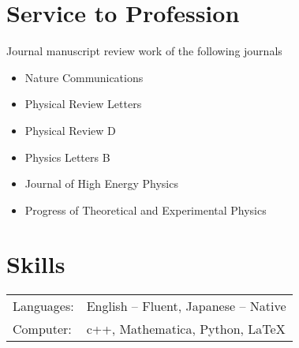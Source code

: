 \documentclass[12pt]{article}
\begin{document}
\section*{Service to Profession}
\vspace*{1em}
Journal manuscript review work of the following journals
\begin{itemize}
  \setlength\itemsep{0em}
  \item Nature Communications
  \item Physical Review Letters
  \item Physical Review D
  \item Physics Letters B
  \item Journal of High Energy Physics
  \item Progress of Theoretical and Experimental Physics
\end{itemize}

\section*{Skills}
\begin{table}[H]
  \begin{tabular}{lp{6in}}
    Languages: & English -- Fluent, Japanese -- Native \\
    Computer: & c++, Mathematica, Python, LaTeX
  \end{tabular}
\end{table}
\end{document}
